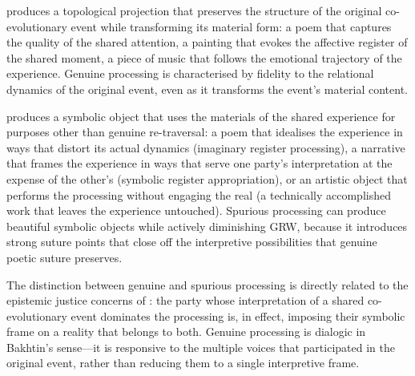  produces a topological projection that preserves the structure of the original co-evolutionary event while transforming its material form: a poem that captures the quality of the shared attention, a painting that evokes the affective register of the shared moment, a piece of music that follows the emotional trajectory of the experience. Genuine processing is characterised by fidelity to the relational dynamics of the original event, even as it transforms the event's material content.

 produces a symbolic object that uses the materials of the shared experience for purposes other than genuine re-traversal: a poem that idealises the experience in ways that distort its actual dynamics (imaginary register processing), a narrative that frames the experience in ways that serve one party's interpretation at the expense of the other's (symbolic register appropriation), or an artistic object that performs the processing without engaging the real (a technically accomplished work that leaves the experience untouched). Spurious processing can produce beautiful symbolic objects while actively diminishing GRW, because it introduces strong suture points that close off the interpretive possibilities that genuine poetic suture preserves.

The distinction between genuine and spurious processing is directly related to the epistemic justice concerns of : the party whose interpretation of a shared co-evolutionary event dominates the processing is, in effect, imposing their symbolic frame on a reality that belongs to both. Genuine processing is dialogic in Bakhtin's sense---it is responsive to the multiple voices that participated in the original event, rather than reducing them to a single interpretive frame.
